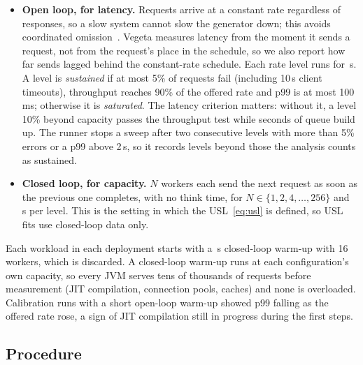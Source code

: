 \begin{itemize}
\item \textbf{Open loop, for latency.} Requests arrive at a constant rate regardless of responses, so a slow
system cannot slow the generator down; this avoids coordinated omission~\cite{Tene2015}. Vegeta measures latency
from the moment it sends a request, not from the request's place in the schedule, so we also report how far sends
lagged behind the constant-rate schedule. Each rate level runs for \,s. A level is \emph{sustained}
if at most 5\% of requests fail (including 10\,s client timeouts), throughput reaches 90\% of the offered rate and
p99 is at most 100\,ms; otherwise it is \emph{saturated}. The latency criterion matters: without it, a level 10\%
beyond capacity passes the throughput test while seconds of queue build up. The runner stops a sweep after two
consecutive levels with more than 5\% errors or a p99 above 2\,s, so it records levels beyond those the analysis
counts as sustained.
\item \textbf{Closed loop, for capacity.} $N$ workers each send the next request as soon as the previous one
completes, with no think time, for $N \in \{1, 2, 4, \dots, 256\}$ and \,s per level. This is
the setting in which the USL~\eqref{eq:usl} is defined, so USL fits use closed-loop data only.
\end{itemize}

Each workload in each deployment starts with a \,s closed-loop warm-up with 16 workers, which is
discarded. A closed-loop warm-up runs at each configuration's own capacity, so every JVM serves tens of thousands
of requests before measurement (JIT compilation, connection pools, caches) and none is overloaded. Calibration
runs with a short open-loop warm-up showed p99 falling as the offered rate rose, a sign of JIT compilation still
in progress during the first steps.

\subsection{Procedure}
\label{sec:procedure}

